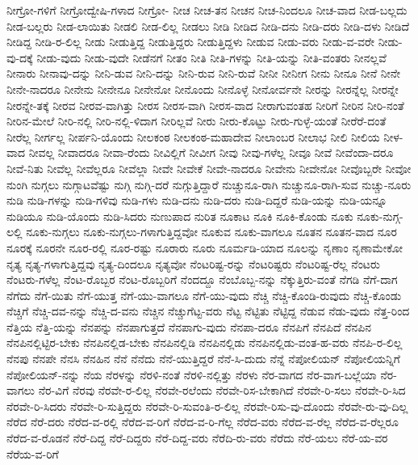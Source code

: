 {ನೀಗ್ರೋ-ಗಳಿಗೆ
ನೀಗ್ರೋದ್ವೇಷಿ-ಗಳಾದ
ನೀಗ್ರೋ-
ನೀಚ
ನೀಚ-ತನ
ನೀಚನ
ನೀಚ-ನಿಂದಲೂ
ನೀಚ-ವಾದ
ನೀಡ-ಬಲ್ಲದು
ನೀಡ-ಬಲ್ಲರು
ನೀಡ-ಲಾಯಿತು
ನೀಡಲಿ
ನೀಡ-ಲಿಲ್ಲ
ನೀಡಲು
ನೀಡಿ
ನೀಡಿದ
ನೀಡಿ-ದನು
ನೀಡಿ-ದರು
ನೀಡಿ-ದಳು
ನೀಡಿದೆ
ನೀಡಿದ್ದ
ನೀಡಿ-ರ-ಲಿಲ್ಲ
ನೀಡು
ನೀಡುತ್ತಿದ್ದ
ನೀಡುತ್ತಿದ್ದರು
ನೀಡುತ್ತಿದ್ದಳು
ನೀಡುವ
ನೀಡು-ವರು
ನೀಡು-ವ-ವರೇ
ನೀಡು-ವು-ದಕ್ಕೆ
ನೀಡು-ವುದು
ನೀಡು-ವುದೇ
ನೀಡೆನಗೆ
ನೀತಂ
ನೀತಿ
ನೀತಿ-ಗಳನ್ನು
ನೀತಿ-ಯನ್ನು
ನೀತಿ-ವಂತರು
ನೀನಲ್ಲವೆ
ನೀನಾರು
ನೀನಾವು-ದನ್ನು
ನೀನಿ-ಡುವ
ನೀನಿ-ದನ್ನು
ನೀನಿ-ರುವ
ನೀನಿ-ರುವೆ
ನೀನೀ
ನೀನೀಗ
ನೀನು
ನೀನೂ
ನೀನೆ
ನೀನೇ
ನೀನೇ-ನಾದರೂ
ನೀನೇನು
ನೀನೇನೂ
ನೀನೇನೋ
ನೀನೊಂದು
ನೀನೊಳ್ಳೆ
ನೀನೋರ್ವನೇ
ನೀರನ್ನು
ನೀರನ್ನೆಲ್ಲ
ನೀರನ್ನೇ
ನೀರನ್ನೇ-ತಕ್ಕೆ
ನೀರವ
ನೀರವ-ವಾಗಿತ್ತು
ನೀರಸ
ನೀರಸ-ವಾಗಿ
ನೀರಸ-ವಾದ
ನೀರಾಗುವಂತಹ
ನೀರಿಗೆ
ನೀರಿನ
ನೀರಿ-ನಂತೆ
ನೀರಿನ-ಮೇಲೆ
ನೀರಿ-ನಲ್ಲಿ
ನೀರಿ-ನಲ್ಲಿ-ಳಿದಾಗ
ನೀರಿಲ್ಲವೆ
ನೀರು
ನೀರು-ಕೊಟ್ಟು
ನೀರು-ಗುಳ್ಳೆ-ಯಂತೆ
ನೀರೆರೆ-ದಂತೆ
ನೀರೆಲ್ಲ
ನೀರ್ಗಲ್ಲ
ನೀರ್ಪನಿ-ಯೊಂದು
ನೀಲಕಂಠ
ನೀಲಕಂಠ-ಮಹಾದೇವ
ನೀಲಾಂಬರ
ನೀಲಾಭ
ನೀಲಿ
ನೀಲಿಯ
ನೀಳ-ವಾದ
ನೀವಲ್ಲ
ನೀವಾದರೂ
ನೀವಾ-ರೆಂದು
ನೀವಿಲ್ಲಿಗೆ
ನೀವೀಗ
ನೀವು
ನೀವು-ಗಳೆಲ್ಲ
ನೀವೂ
ನೀವೆ
ನೀವೆಂದಾ-ದರೂ
ನೀವೆ-ನಿತು
ನೀವೆಲ್ಲ
ನೀವೆಲ್ಲರೂ
ನೀವೆಲ್ಲಾ
ನೀವೇ
ನೀವೇಕೆ
ನೀವೇ-ನಾದರೂ
ನೀವೇನು
ನೀವೇನೋ
ನೀವೊಬ್ಬರೇ
ನೀವೋ
ನುಂಗಿ
ನುಗ್ಗಲು
ನುಗ್ಗಾಟವೆಷ್ಟು
ನುಗ್ಗಿ
ನುಗ್ಗಿ-ದರೆ
ನುಗ್ಗುತ್ತಿದ್ದಾರೆ
ನುಚ್ಚುನೂ-ರಾಗಿ
ನುಚ್ಚುನೂ-ರಾಗಿ-ಸುವ
ನುಚ್ಚು-ನೂರು
ನುಡಿ
ನುಡಿ-ಗಳನ್ನು
ನುಡಿ-ಗಳಿವು
ನುಡಿ-ಗಳು
ನುಡಿ-ದನು
ನುಡಿ-ದರು
ನುಡಿ-ದಿದ್ದರೆ
ನುಡಿ-ಯನ್ನು
ನುಡಿ-ಯನ್ನೂ
ನುಡಿಯೂ
ನುಡಿ-ಯೊಂದು
ನುಡಿ-ಸಿದರು
ನುಣುಪಾದ
ನುರಿತ
ನೂಕಾಟ
ನೂಕಿ
ನೂಕಿ-ಕೊಂಡು
ನೂಕು
ನೂಕು-ನುಗ್ಗ-ಲಲ್ಲಿ
ನೂಕು-ನುಗ್ಗಲು
ನೂಕು-ನುಗ್ಗಲು-ಗಳಾಗುತ್ತಿದ್ದವೋ
ನೂಕುವ
ನೂಕು-ವಾಗಲೂ
ನೂತನ
ನೂತನ-ವಾದ
ನೂರ
ನೂರಕ್ಕೆ
ನೂರನೇ
ನೂರ-ರಲ್ಲಿ
ನೂರ-ರಷ್ಟು
ನೂರಾರು
ನೂರು
ನೂರ್ಮಡಿ-ಯಾದ
ನೂಲನ್ನು
ನೃಣಾಂ
ನೃಣಾಮೇಕೋ
ನೃತ್ಯ
ನೃತ್ಯ-ಗಳಾಗುತ್ತಿದ್ದವು
ನೃತ್ಯ-ದಿಂದಲೂ
ನೃತ್ಯವೋ
ನೆಂಟರಿಷ್ಟ-ರನ್ನು
ನೆಂಟರಿಷ್ಟರು
ನೆಂಟರಿಷ್ಟ-ರೆಲ್ಲ
ನೆಂಟರು
ನೆಂಟರು-ಗಳೆಲ್ಲ
ನೆಂಟ-ರೊಬ್ಬರ
ನೆಂಟ-ರೊಬ್ಬರಿಗೆ
ನೆಂದದ್ದೂ
ನೆಂಬೊಬ್ಬ-ನನ್ನು
ನೆಕ್ಕುತ್ತಿರು-ವಂತೆ
ನೆಗಡಿ
ನೆಗೆ-ದಾಗ
ನೆಗೆದು
ನೆಗೆ-ಯಿತು
ನೆಗೆ-ಯುತ್ತ
ನೆಗೆ-ಯು-ವಾಗಲೂ
ನೆಗೆ-ಯು-ವುದು
ನೆಚ್ಚಿ
ನೆಚ್ಚಿ-ಕೊಂಡಿ-ರುವುದು
ನೆಚ್ಚಿ-ಕೊಂಡು
ನೆಚ್ಚಿಗೆ
ನೆಚ್ಚಿ-ದವ-ನನ್ನು
ನೆಚ್ಚಿ-ದ-ವನು
ನೆಚ್ಚಿನ
ನೆಚ್ಚುಗೆಟ್ಟ-ವರು
ನೆಟ್ಟ
ನೆಟ್ಟಿತು
ನೆಟ್ಟಿದ್ದ
ನೆಡುವ
ನೆಡು-ವುದು
ನೆತ್ತ-ರಿಂದ
ನೆತ್ತಿಯ
ನೆತ್ತಿ-ಯನ್ನು
ನೆನಪನ್ನು
ನೆನಪಾಗುತ್ತದೆ
ನೆನಪಾಗು-ವುದು
ನೆನಪಾ-ದರೂ
ನೆನಪಿಗೆ
ನೆನಪಿದೆ
ನೆನಪಿನ
ನೆನಪಿನಲ್ಲಿಟ್ಟಿರ-ಬೇಕು
ನೆನಪಿನಲ್ಲಿಡ-ಬೇಕು
ನೆನಪಿನಲ್ಲಿಡಿ
ನೆನಪಿನಲ್ಲಿಡು
ನೆನಪಿನಲ್ಲಿಡು-ವಂತ-ಹ-ವರು
ನೆನಪಿ-ರ-ಲಿಲ್ಲ
ನೆನಪು
ನೆನಪೇ
ನೆನಸಿ
ನೆನಹಿನ
ನೆನೆ
ನೆನೆದು
ನೆನೆ-ಯುತ್ತಿದ್ದರೆ
ನೆನೆ-ಸಿ-ದುದು
ನೆನ್ನೆ
ನೆಪೋಲಿಯನ್
ನೆಪೋಲಿಯನ್ನಿಗೆ
ನೆಪೋಲಿಯನ್-ನನ್ನು
ನೆಯ
ನೆರಳನ್ನು
ನೆರಳಿ-ನಂತೆ
ನೆರಳಿ-ನಲ್ಲಿತ್ತು
ನೆರಳು
ನೆರ-ವಾಗದ
ನೆರ-ವಾಗ-ಬಲ್ಲೆಯಾ
ನೆರ-ವಾಗಲು
ನೆರ-ವಿಗೆ
ನೆರವು
ನೆರವೇ-ರ-ಲಿಲ್ಲ
ನೆರವೇ-ರಲೆಂದು
ನೆರವೇ-ರಿಸ-ಬೇಕಾಗಿದೆ
ನೆರವೇ-ರಿ-ಸಲು
ನೆರವೇ-ರಿ-ಸಿದ
ನೆರವೇ-ರಿ-ಸಿದರು
ನೆರವೇ-ರಿ-ಸುತ್ತಿದ್ದರು
ನೆರವೇ-ರಿ-ಸುವಂತಿ-ರ-ಲಿಲ್ಲ
ನೆರವೇ-ರಿಸು-ವು-ದೊಂದು
ನೆರವೇ-ರು-ವು-ದಿಲ್ಲ
ನೆರೆದ
ನೆರೆ-ದರು
ನೆರೆದ-ವ-ರಲ್ಲಿ
ನೆರೆದ-ವ-ರಿಗೆ
ನೆರೆದ-ವ-ರಿ-ಗೆಲ್ಲ
ನೆರೆದ-ವರು
ನೆರೆದ-ವ-ರೆಲ್ಲ
ನೆರೆದ-ವ-ರೆಲ್ಲರೂ
ನೆರೆದ-ವ-ರೊಡನೆ
ನೆರೆ-ದಿದ್ದ
ನೆರೆ-ದಿದ್ದರು
ನೆರೆ-ದಿದ್ದ-ವರು
ನೆರೆದಿ-ರು-ವರು
ನೆರೆದು
ನೆರೆ-ಯಲು
ನೆರೆ-ಯ-ವರ
ನೆರೆಯ-ವ-ರಿಗೆ
}
